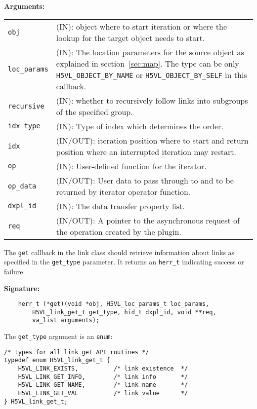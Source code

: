 \textbf{Arguments:}\\
\begin{tabular}{l p{10cm}}
  {\tt obj} & (IN): object where to start iteration or where the
  lookup for the target object needs to start. \\
  {\tt loc\_params} & (IN): The location parameters for the source
  object as explained in section~\ref{sec:map}. The type can be only {\tt
    H5VL\_OBJECT\_BY\_NAME} or {\tt H5VL\_OBJECT\_BY\_SELF} in this
  callback.\\ 
  {\tt recursive} & (IN): whether to recursively follow links into
  subgroups of the specified group.\\
  {\tt idx\_type} & (IN): Type of index which determines the order.\\
  {\tt idx} & (IN/OUT): iteration position where to start and return
  position where an interrupted iteration may restart.\\
  {\tt op} & (IN): User-defined function for the iterator.\\
  {\tt op\_data} & (IN/OUT): User data to pass through to and to be
  returned by iterator operator function.\\
  {\tt dxpl\_id} & (IN): The data transfer property list.\\
  {\tt req} & (IN/OUT): A pointer to the asynchronous request of the
  operation created by the plugin.\\
\end{tabular}

The {\tt get} callback in the link class should retrieve information
about links as specified in the {\tt get\_type} parameter. It
returns an {\tt herr\_t} indicating success or failure.

\textbf{Signature:}
\begin{lstlisting}
    herr_t (*get)(void *obj, H5VL_loc_params_t loc_params, 
        H5VL_link_get_t get_type, hid_t dxpl_id, void **req, 
        va_list arguments);
\end{lstlisting}

The {\tt get\_type} argument is an {\tt enum}:
\begin{lstlisting}
/* types for all link get API routines */
typedef enum H5VL_link_get_t {
    H5VL_LINK_EXISTS,          /* link existence  */
    H5VL_LINK_GET_INFO,        /* link info       */
    H5VL_LINK_GET_NAME,        /* link name       */
    H5VL_LINK_GET_VAL          /* link value      */
} H5VL_link_get_t;
\end{lstlisting}

